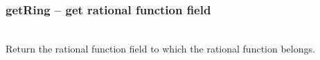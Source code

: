   \subsubsection{getRing -- get rational function field}
   \\
   \spacing
   \quad Return the rational function field to which the rational function belongs.
\C



